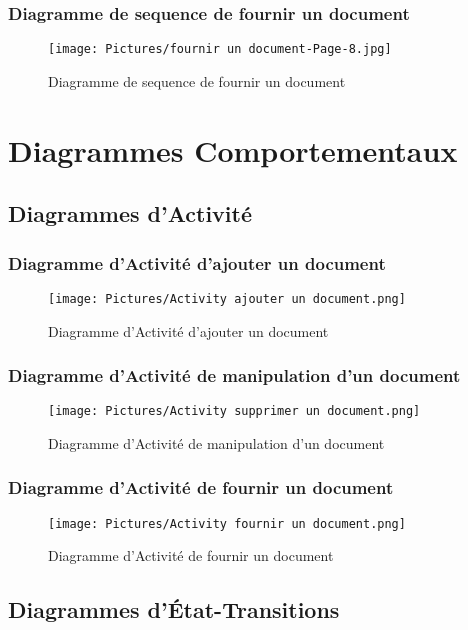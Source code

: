 \documentclass[11pt,fleqn]{book} %
\begin{document}
\subsubsection{Diagramme de sequence de fournir un document}
\begin{figure}[h]
    \centering
    \texttt{[image: Pictures/fournir un document-Page-8.jpg]}
    \caption{Diagramme de sequence de fournir un document}
    \label{fig:pca}
\end{figure}
\newpage
\section{Diagrammes Comportementaux}
\subsection{Diagrammes d’Activité}
\subsubsection{Diagramme d’Activité d'ajouter un document}
\begin{figure}[h]
    \centering
    \texttt{[image: Pictures/Activity ajouter un document.png]}
    \caption{Diagramme d’Activité d'ajouter un document}
    \label{fig:pca}
\end{figure}
\newpage
\subsubsection{Diagramme d’Activité de manipulation d'un document}
\begin{figure}[h]
    \centering
    \texttt{[image: Pictures/Activity supprimer un document.png]}
    \caption{Diagramme d’Activité de manipulation d'un document}
    \label{fig:pca}
\end{figure}
\newpage
\subsubsection{Diagramme d’Activité de fournir un document}
\begin{figure}[h]
    \centering
    \texttt{[image: Pictures/Activity fournir un document.png]}
    \caption{Diagramme d’Activité de fournir un document}
    \label{fig:pca}
\end{figure}
\newpage
\subsection{Diagrammes d’État-Transitions}
\end{document}
